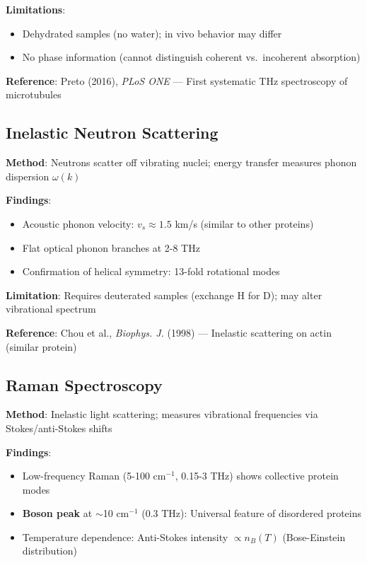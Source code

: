 \textbf{Limitations}:
\begin{itemize}
\item Dehydrated samples (no water); in vivo behavior may differ
\item No phase information (cannot distinguish coherent vs.~incoherent absorption)
\end{itemize}

\textbf{Reference}: Preto (2016), \emph{PLoS ONE} --- First
systematic THz spectroscopy of microtubules

\subsection{Inelastic Neutron Scattering}\label{inelastic-neutron-scattering-established}

\textbf{Method}: Neutrons scatter off vibrating nuclei; energy transfer measures phonon dispersion $\omega(k)$

\textbf{Findings}:
\begin{itemize}
\item Acoustic phonon velocity: $v_s \approx 1.5$ km/s (similar to other proteins)
\item Flat optical phonon branches at 2-8 THz
\item Confirmation of helical symmetry: 13-fold rotational modes
\end{itemize}

\textbf{Limitation}: Requires deuterated samples (exchange H for D); may
alter vibrational spectrum

\textbf{Reference}: Chou et al., \emph{Biophys. J.} (1998) ---
Inelastic scattering on actin (similar protein)

\subsection{Raman Spectroscopy}\label{raman-spectroscopy-established}

\textbf{Method}: Inelastic light scattering; measures vibrational frequencies via Stokes/anti-Stokes shifts

\textbf{Findings}:
\begin{itemize}
\item Low-frequency Raman (5-100 cm$^{-1}$, 0.15-3 THz) shows collective protein modes
\item \textbf{Boson peak} at $\sim$10 cm$^{-1}$ (0.3 THz): Universal feature of disordered proteins
\item Temperature dependence: Anti-Stokes intensity $\propto n_B(T)$ (Bose-Einstein distribution)
\end{itemize}

